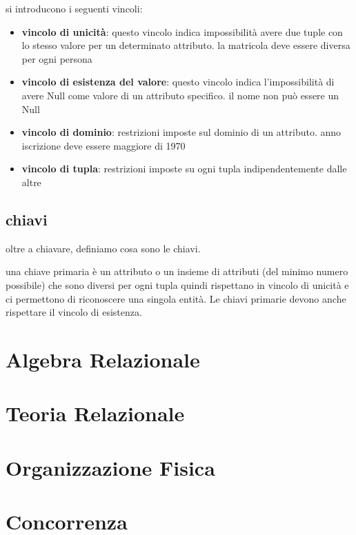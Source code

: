 \documentclass{article}
\begin{document}
        si introducono i seguenti vincoli:
        \begin{itemize}
            \item \textbf{vincolo di unicità}:
                questo vincolo indica impossibilità avere due tuple con lo stesso valore per un determinato attributo. la matricola deve essere diversa per ogni persona
            \item \textbf{vincolo di esistenza del valore}:
                questo vincolo indica l'impossibilità di avere Null come valore di un attributo specifico. il nome non può essere un Null
            \item \textbf{vincolo di dominio}:
                restrizioni imposte sul dominio di un attributo. anno iscrizione deve essere maggiore di 1970
            \item \textbf{vincolo di tupla}:
                restrizioni imposte su ogni tupla indipendentemente dalle altre
        \end{itemize}
%
    \subsection{chiavi}
        oltre a chiavare, definiamo cosa sono le chiavi.
        \begin{tcolorbox}[colback= green!10!white, colframe= green!40!black, title=chiavi primarie]
            una chiave primaria è un attributo o un insieme di attributi (del minimo numero possibile) che sono diversi per ogni tupla quindi rispettano in vincolo di unicità e ci permettono di riconoscere una singola entità. Le chiavi primarie devono anche rispettare il vincolo di esistenza.
        \end{tcolorbox}
\section{Algebra Relazionale}

\section{Teoria Relazionale}

\section{Organizzazione Fisica}

\section{Concorrenza} \label{sec:concorrenza}
\end{document}
